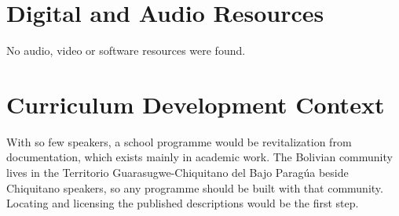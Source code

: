 \documentclass[12pt]{article}
\begin{document}
\section{Digital and Audio Resources}
No audio, video or software resources were found.

\section{Curriculum Development Context}
With so few speakers, a school programme would be revitalization from documentation, which exists mainly in academic work. The Bolivian community lives in the Territorio Guarasugwe-Chiquitano del Bajo Parag\'ua beside Chiquitano speakers, so any programme should be built with that community. Locating and licensing the published descriptions would be the first step.
\end{document}
